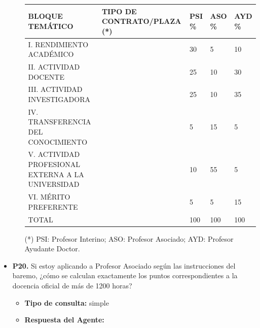 \documentclass{article}
\begin{document}
\begin{itemize}
\begin{itemize}
\begin{scriptsize}
                  \vspace{0.4cm}
                  \begin{table}[h!]\centering\renewcommand{\arraystretch}{1.3}
                    \begin{tabular}{|p{}|p{}|p{}|p{}|p{}|}\hline
                      BLOQUE TEMÁTICO                                   & TIPO DE CONTRATO/PLAZA (*) & PSI \% & ASO \% & AYD \% \\\hline
                      I. RENDIMIENTO ACADÉMICO                          &                            & 30     & 5      & 10     \\\hline
                      II. ACTIVIDAD DOCENTE                             &                            & 25     & 10     & 30     \\\hline
                      III. ACTIVIDAD INVESTIGADORA                      &                            & 25     & 10     & 35     \\\hline
                      IV. TRANSFERENCIA DEL CONOCIMIENTO                &                            & 5      & 15     & 5      \\\hline
                      V. ACTIVIDAD PROFESIONAL EXTERNA A LA UNIVERSIDAD &                            & 10     & 55     & 5      \\\hline
                      VI. MÉRITO PREFERENTE                             &                            & 5      & 5      & 15     \\\hline
                      TOTAL                                             &                            & 100    & 100    & 100    \\\hline
                    \end{tabular}\end{table}
                  \vspace{0.4cm}

                  (*) PSI: Profesor Interino; ASO: Profesor Asociado; AYD: Profesor Ayudante Doctor.
                \end{scriptsize}
        \end{itemize}


  \item \textbf{P20.} Si estoy aplicando a Profesor Asociado según las instrucciones del baremo, ¿cómo se calculan exactamente los puntos correspondientes a la docencia oficial de más de 1200 horas? \\
        \begin{itemize}
          \item \textbf{Tipo de consulta:} simple
          \item \textbf{Respuesta del Agente:}


\end{itemize}
\end{itemize}
\end{document}
